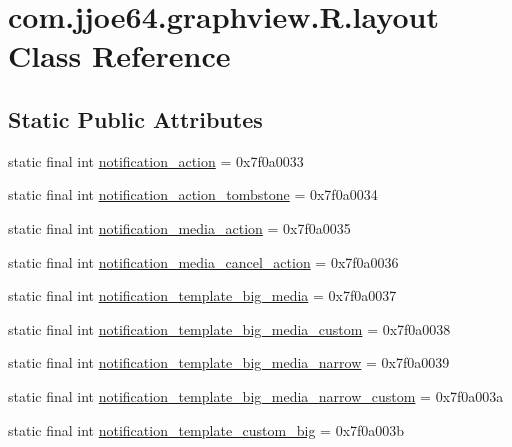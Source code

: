 \hypertarget{classcom_1_1jjoe64_1_1graphview_1_1_r_1_1layout}{}\section{com.\+jjoe64.\+graphview.\+R.\+layout Class Reference}
\label{classcom_1_1jjoe64_1_1graphview_1_1_r_1_1layout}
\subsection*{Static Public Attributes}
\begin{DoxyCompactItemize}
\item 
static final int \mbox{\hyperlink{classcom_1_1jjoe64_1_1graphview_1_1_r_1_1layout_ae32bcd38d98a4a6171c8ea1740d1f5ce}{notification\+\_\+action}} = 0x7f0a0033
\item 
static final int \mbox{\hyperlink{classcom_1_1jjoe64_1_1graphview_1_1_r_1_1layout_a031097b5fe6d963c5b0eafc65e48e880}{notification\+\_\+action\+\_\+tombstone}} = 0x7f0a0034
\item 
static final int \mbox{\hyperlink{classcom_1_1jjoe64_1_1graphview_1_1_r_1_1layout_a9abac9c254e95d3981a0f461bdd12f7e}{notification\+\_\+media\+\_\+action}} = 0x7f0a0035
\item 
static final int \mbox{\hyperlink{classcom_1_1jjoe64_1_1graphview_1_1_r_1_1layout_a1b205cd747942454a16027abc94d8c08}{notification\+\_\+media\+\_\+cancel\+\_\+action}} = 0x7f0a0036
\item 
static final int \mbox{\hyperlink{classcom_1_1jjoe64_1_1graphview_1_1_r_1_1layout_a3c5a72b6bea1ce7afb07f1a3d0e14e28}{notification\+\_\+template\+\_\+big\+\_\+media}} = 0x7f0a0037
\item 
static final int \mbox{\hyperlink{classcom_1_1jjoe64_1_1graphview_1_1_r_1_1layout_a22b4d8e78ff442e6a14a63a5f1a67e08}{notification\+\_\+template\+\_\+big\+\_\+media\+\_\+custom}} = 0x7f0a0038
\item 
static final int \mbox{\hyperlink{classcom_1_1jjoe64_1_1graphview_1_1_r_1_1layout_a4dd38faf7afbae90a8e094ef2fa2d232}{notification\+\_\+template\+\_\+big\+\_\+media\+\_\+narrow}} = 0x7f0a0039
\item 
static final int \mbox{\hyperlink{classcom_1_1jjoe64_1_1graphview_1_1_r_1_1layout_a2835efbda4c02ea18431206923f5562c}{notification\+\_\+template\+\_\+big\+\_\+media\+\_\+narrow\+\_\+custom}} = 0x7f0a003a
\item 
static final int \mbox{\hyperlink{classcom_1_1jjoe64_1_1graphview_1_1_r_1_1layout_a3602776815f6d6b65177018195026659}{notification\+\_\+template\+\_\+custom\+\_\+big}} = 0x7f0a003b

\end{DoxyCompactItemize}
